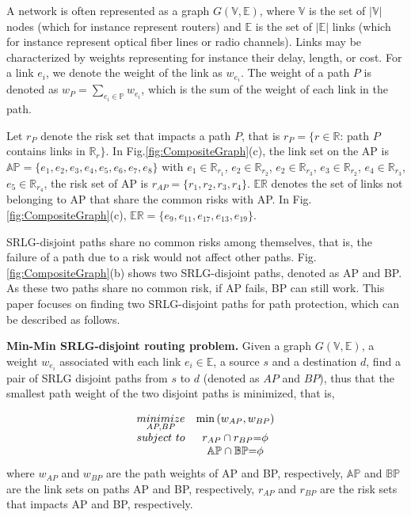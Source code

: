 A network is often represented as a graph $G(\mathbb{V},\mathbb{E})$, where $\mathbb{V}$ is the set of $|\mathbb{V}|$ nodes (which for instance represent routers) and $\mathbb{E}$ is the set of $|\mathbb{E}|$ links (which for instance represent optical fiber lines or radio channels). Links may be characterized by weights representing for instance their delay, length, or cost. For a link $e_i$, we denote the weight of the link as $w_{e_i}$. The weight of a path $P$ is denoted as $w_P=\sum\limits_{e_i\in \mathbb{P}}w_{e_i}$, which is the sum of  the weight of each link in the path.

Let $r_P$ denote the risk set that impacts a path $P$, that is $r_P=\{r\in \mathbb{R}$: path $P$ contains links in $\mathbb{R}_r\}$. In Fig.\ref{fig:CompositeGraph}(c), the link set on the AP is $\mathbb{AP}=\{e_1,e_2,e_3,e_4,e_5,e_6,e_7,e_8\}$ with $e_1\in \mathbb{R}_{r_1}$, $e_2\in \mathbb{R}_{r_2}$, $e_2\in \mathbb{R}_{r_3}$, $e_3\in \mathbb{R}_{r_2}$, $e_4\in \mathbb{R}_{r_3}$, $e_5\in \mathbb{R}_{r_4}$,  the risk set of AP is ${r}_{{AP}}=\{r_1, r_2, r_3, r_4\}$. $\mathbb{\mathbb{ER}}$ denotes the set of links not belonging to AP that share the common risks with AP. In Fig.\ref{fig:CompositeGraph}(c), $\mathbb{\mathbb{ER}}=\{e_9,e_{11},e_{17},e_{13},e_{19}\}$.

SRLG-disjoint paths share no common risks among themselves, that is, the failure of a path due to a risk would not affect other paths. Fig.\ref{fig:CompositeGraph}(b) shows two SRLG-disjoint paths, denoted as AP and BP. As these two paths share no common risk, if AP fails, BP can still work. This paper focuses on finding  two SRLG-disjoint paths for path protection, which can be described as follows.

\textbf{Min-Min SRLG-disjoint routing problem.} Given a graph $G(\mathbb{V},\mathbb{E})$, a weight $w_{e_i}$ associated with each link $e_i\in \mathbb{E}$, a source  $s$ and a destination  $d$,  find a pair of SRLG disjoint paths from $s$ to $d$ (denoted as $AP$ and $BP$), thus that  the smallest path weight of the two disjoint paths is minimized, that is,

\begin{equation}
\begin{array}{*{20}{c}}
   {\mathop {minimize}\limits_{AP,BP} } & {\min \left( {{w_{AP}},{w_{BP}}} \right)}  \\
   {subject\ to} & {{r_{AP}} \cap {r_{BP}}{\rm{ = }}\phi }  \\
   {} & {\mathbb{AP} \cap \mathbb{BP}{\rm{ = }}\phi }  \\
\end{array}
\label{eq:problem definition}
\end{equation}
where ${w_{AP}}$ and ${w_{BP}}$ are the path weights of AP and BP, respectively, $\mathbb{AP}$ and $\mathbb{BP}$ are the link sets on paths AP and BP, respectively, ${r_{AP}}$ and ${r_{BP}}$ are the risk sets that impacts AP and BP, respectively.

